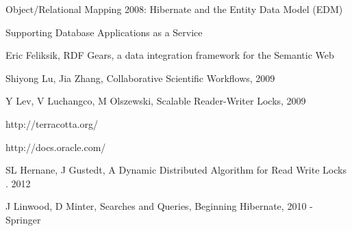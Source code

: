 \documentclass[a4paper, notitlepage]{article}
\begin{document}
\begin{thebibliography}{99}

 Object/Relational Mapping 2008: Hibernate and the Entity Data Model (EDM)

 Supporting Database Applications as a Service

 Eric Feliksik, RDF Gears, a data integration framework for the Semantic Web

 Shiyong Lu, Jia Zhang, Collaborative Scientific Workflows, 2009

 Y Lev, V Luchangco, M Olszewski, Scalable Reader-Writer Locks, 2009

 http://terracotta.org/

 http://docs.oracle.com/

 SL Hernane, J Gustedt, A Dynamic Distributed Algorithm for Read Write Locks . 2012

 J Linwood, D Minter, Searches and Queries, Beginning Hibernate, 2010 - Springer

\end{thebibliography}
\end{document}
